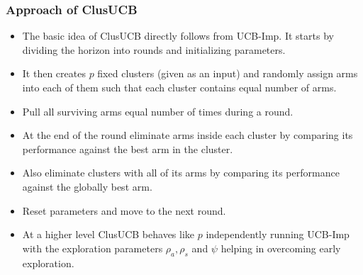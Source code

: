 \begin{frame}
\frametitle{Approach of ClusUCB}
\begin{itemize}
\item<1-> The basic idea of ClusUCB directly follows from UCB-Imp. It starts by dividing the horizon into rounds and initializing parameters.
\item<2-> It then creates $p$ fixed clusters (given as an input) and randomly assign arms into each of them such that each cluster contains equal number of arms.
\item<3-> Pull all surviving arms equal number of times during a round.
\item<4-> At the end of the round eliminate arms inside each cluster by comparing its performance against the best arm in the cluster. 
\item<5-> Also eliminate clusters with all of its arms by comparing its performance against the globally  best arm. 
\item<5-> Reset parameters and move to the next round.
\item<6-> At a higher level ClusUCB behaves like $p$ independently running UCB-Imp with the exploration parameters $\rho_a,\rho_s$ and $\psi$ helping in overcoming early exploration.
\end{itemize}
\end{frame}

